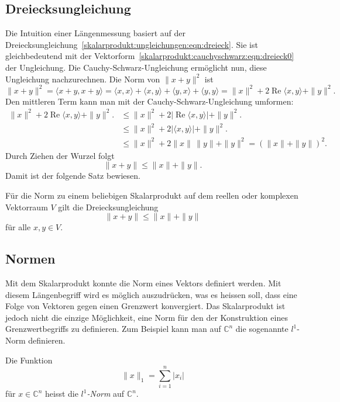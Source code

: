 \subsection{Dreiecksungleichung}
Die Intuition einer Längenmessung basiert auf der
Dreiecksungleichung~\eqref{skalarprodukt:ungleichungen:eqn:dreieck}.
Sie ist gleichbedeutend mit der
Vektorform~\eqref{skalarprodukt:cauchyschwarz:eqn:dreieck0}
der Ungleichung.
Die Cauchy-Schwarz-Ungleichung ermöglicht nun, diese Ungleichung
nachzurechnen.
Die Norm von $\|x+y\|^2$ ist
\[
\|x+y\|^2
=
\langle x+y,x+y\rangle
=
\langle x,x\rangle
+
\langle x,y\rangle
+
\langle y,x\rangle
+
\langle y,y\rangle
=
\|x\|^2 + 2\operatorname{Re}\langle x,y\rangle + \|y\|^2.
\]
Den mittleren Term kann man mit der Cauchy-Schwarz-Ungleichung
umformen:
\begin{align*}
\|x\|^2 + 2\operatorname{Re}\langle x,y\rangle + \|y\|^2.
&\le
\|x\|^2 + 2|\operatorname{Re}\langle x,y\rangle| + \|y\|^2.
\\
&\le
\|x\|^2 + 2|\langle x,y\rangle| + \|y\|^2.
\\
&\le
\|x\|^2 + 2\|x\|\,\|y\| + \|y\|^2
=
(\|x\| + \|y\|)^2.
\end{align*}
Durch Ziehen der Wurzel folgt
\[
\|x+y\| \le \|x\| + \|y\|.
\]
Damit ist der folgende Satz bewiesen.

\begin{satz}[Dreiecksungleichung]
%
Für die Norm zu einem beliebigen Skalarprodukt auf dem reellen
oder komplexen Vektorraum $V$ gilt die Dreiecksungleichung
\[
\|x+y\| \le \|x\| + \|y\|
\]
für alle $x,y\in V$.
\end{satz}

%
%
\subsection{Normen
\label{skalarprodukt:cauchyschwarz:subsection:norm}}
Mit dem Skalarprodukt konnte die Norm eines Vektors definiert werden.
Mit diesem Längenbegriff wird es möglich auszudrücken, was es heissen
soll, dass eine Folge von Vektoren gegen einen Grenzwert konvergiert.
Das Skalarprodukt ist jedoch nicht die einzige Möglichkeit, eine 
Norm für den der Konstruktion eines Grenzwertbegriffs zu definieren.
Zum Beispiel kann man auf $\mathbb{C}^n$ die sogenannte $l^1$-Norm
definieren.

\begin{definition}[$l^1$]
\label{buch:skalarprodukt:cauchyschwarz:def:l1}
Die Funktion
\[
\|x\|_1
=
\sum_{i=1}^n |x_i|
\]
für $x\in\mathbb{C}^n$ heisst die {\em $l^1$-Norm} auf $\mathbb{C}^n$.
%
\end{definition}

